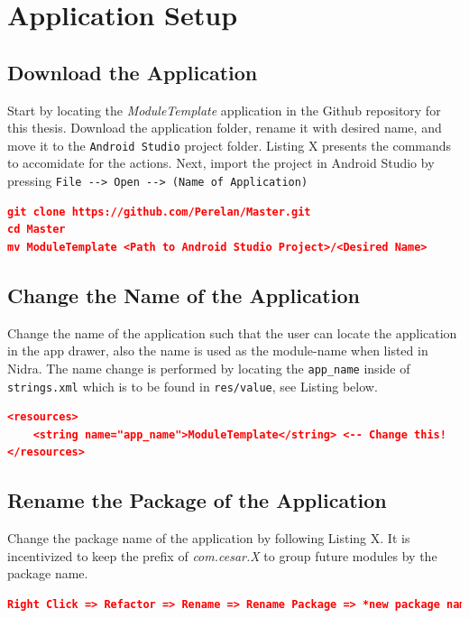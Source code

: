 \section{Application Setup}

\subsection{Download the Application}
Start by locating the \textit{ModuleTemplate} application in the Github repository for this thesis. Download the application folder, rename it with desired name, and move it to the \verb|Android Studio| project folder. Listing X presents the commands to accomidate for the actions. Next, import the project in Android Studio by pressing \verb|File --> Open --> (Name of Application)|

\begin{lstlisting}[language=json, caption={My Caption}, captionpos=b]
git clone https://github.com/Perelan/Master.git
cd Master
mv ModuleTemplate <Path to Android Studio Project>/<Desired Name>
\end{lstlisting}

\subsection{Change the Name of the Application}
Change the name of the application such that the user can locate the application in the app drawer, also the name is used as the module-name when listed in Nidra. The name change is performed by locating the \verb|app_name| inside of \verb|strings.xml| which is to be found in \verb|res/value|, see Listing below. 

\begin{lstlisting}[language=json, caption={My Caption}, captionpos=b]
<resources>
    <string name="app_name">ModuleTemplate</string> <-- Change this!
</resources>
\end{lstlisting}

\subsection{Rename the Package of the Application}
Change the package name of the application by following Listing X. It is incentivized to keep the prefix of \textit{com.cesar.X} to group future modules by the package name. 

\begin{lstlisting}[language=json, caption={My Caption}, captionpos=b]
Right Click => Refactor => Rename => Rename Package => *new package name* => Refactor
\end{lstlisting}

